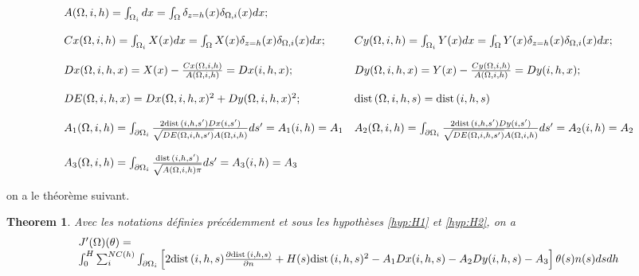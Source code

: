 \documentclass[11pt,a4paper]{article}
\newtheorem{theorem}{Theorem}[section]
\begin{document}
\begin{equation}
\begin{array}{ll}
A(\Omega,i,h)=\int_{\Omega_{i}}dx=\int_{\Omega} \delta_{z=h}(x)\delta_{\Omega,i}(x)dx; & \, \\
\\
Cx(\Omega,i,h)=\int_{\Omega_{i}}X(x)dx=\int_{\Omega} X(x)\delta_{z=h}(x)\delta_{\Omega,i}(x)dx; & Cy(\Omega,i,h)=\int_{\Omega_{i}}Y(x)dx=\int_{\Omega} Y(x)\delta_{z=h}(x)\delta_{\Omega,i}(x)dx;\\	
\\
Dx(\Omega,i,h,x)=X(x)-\frac{Cx(\Omega,i,h)}{A(\Omega,i,h)} =Dx(i,h,x);& Dy(\Omega,i,h,x)=Y(x)-\frac{Cy(\Omega,i,h)}{A(\Omega,i,h)}=Dy(i,h,x); \\
\\
DE(\Omega,i,h,x)=Dx(\Omega,i,h,x)^2+Dy(\Omega,i,h,x)^2; &\textrm{dist}\,(\Omega,i,h,s)=\textrm{dist}\,(i,h,s) \\
\\
A_1(\Omega,i,h)=\int_{\partial\Omega_{i}}\frac{2\textrm{dist}\,(i,h,s')Dx(i,s')}{\sqrt{DE(\Omega,i,h,s')}A(\Omega,i,h)} ds'=A_1(i,h)=A_1 & A_2(\Omega,i,h)=\int_{\partial\Omega_{i}}\frac{2\textrm{dist}\,(i,h,s')Dy(i,s')}{\sqrt{DE(\Omega,i,h,s')}A(\Omega,i,h)}ds'=A_2(i,h)=A_2 \\
\\
A_3(\Omega,i,h)=\int_{\partial\Omega_{i}}\frac{\textrm{dist}\,(i,h,s')}{\sqrt{A(\Omega,i,h)\pi}}ds'=A_3(i,h)=A_3 
\end{array}
\end{equation}

on a le théorème suivant.

\begin{theorem}
	Avec les notations définies précédemment et sous les hypothèses \ref{hyp:H1} et \ref{hyp:H2}, on a 
	\begin{equation}
\begin{array}{l}
	J'(\Omega)(\theta)= \\
	 \int_0^H\sum_{i}^{NC(h)}\int_{\partial\Omega_{i}}\left[2\textrm{\textrm{dist}\,}(i,h,s)\frac{\partial\textrm{\textrm{dist}\,}(i,h,s)}{\partial n}+H(s)\textrm{\textrm{dist}\,}(i,h,s)^2-A_1Dx(i,h,s)-A_2Dy(i,h,s)-A_3\right]\theta(s)n(s)dsdh
\end{array}
	\end{equation}
\end{theorem}
\end{document}
